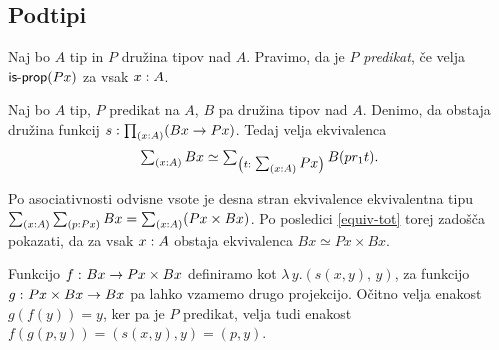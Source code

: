 \subsection{Podtipi}

\begin{definicija}
  Naj bo \(A\) tip in \(P\) družina tipov nad \(A\). Pravimo, da je \(P\) \emph{predikat},
  če velja \(\textnormal{\textsf{is-prop}}(Px)\) za vsak \(x : A\).
\end{definicija}

\begin{trditev}
  \label{full-subtype}
  Naj bo \(A\) tip, \(P\) predikat na \(A\), \(B\) pa družina tipov nad \(A\). Denimo, da
  obstaja družina funkcij \(s : \textstyle \prod_{\left( x : A \right)} (Bx \to Px)\).
  Tedaj velja ekvivalenca
  \[\textstyle \sum_{\left( x : A \right)} Bx \simeq \textstyle \sum_{\left( t : \textstyle \sum_{\left( x : A \right)} Px \right)} B (pr_{1} t).\]
\end{trditev}

\begin{dokaz}
  Po asociativnosti odvisne vsote je desna stran ekvivalence ekvivalentna tipu
  \(\textstyle \sum_{\left( x : A \right)} \textstyle \sum_{\left( p : Px \right)} Bx = \textstyle \sum_{\left( x : A \right)} (Px \times Bx)\).
  Po posledici \ref{equiv-tot} torej zadošča pokazati, da za vsak \(x : A\)
  obstaja ekvivalenca \(Bx \simeq Px \times Bx\).

  Funkcijo \(f \,\colon Bx \to Px \times Bx\) definiramo kot
  \(\lambda \, y. \left(s(x,y),\, y\right)\), za funkcijo \(g \,\colon Px \times Bx \to Bx\) pa
  lahko vzamemo drugo projekcijo. Očitno velja enakost \(g(f(y)) = y\), ker pa je \(P\)
  predikat, velja tudi enakost
  \(f(g\left(p, y\right)) = \left(s(x, y), y\right) = \left(p, y\right)\).

\end{dokaz}

